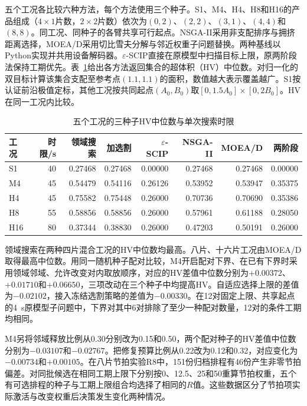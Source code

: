 五个工况各比较六种方法，每个方法使用三个种子。S1、M4、H4、H8和H16的产品组成（$4\times1$片数，$2\times2$片数）依次为$(0,2)$、$(2,2)$、$(3,1)$、$(4,4)$和$(8,8)$。同工况、同种子的各臂共享可行起点。NSGA-II采用非支配排序与拥挤距离选择\citep{deb2002}，MOEA/D采用切比雪夫分解与邻近权重子问题替换\citep{zhangli2007}。两种基线以Python实现并共用设备解码器。$\varepsilon$-SCIP直接在原模型中扫描目标上限，原两阶段法保持工期优先。表~\ref{tab:pareto-small}给出各方法返回集合的超体积（HV）中位数。对归一化的双目标计算该集合支配至参考点$(1.1,1.1)$的面积，数值越大表示覆盖越广。S1按认证前沿极值定标，其他工况按共同起点$(A_0,B_0)$取$[0,1.5A_0]\times[0,2B_0]$。HV在同一工况内比较。
\begin{table}[!htbp]\centering\small
\caption{五个工况的三种子HV中位数与单次搜索时限}\label{tab:pareto-small}
\begin{tabular}{lrrrrrrr}\toprule
工况 & 时限/s & 领域搜索 & 加选割 & $\varepsilon$-SCIP & NSGA-II & MOEA/D & 两阶段 \\\midrule
S1 & 40 & 0.27468 & 0.27468 & 0.00000 & 0.27468 & 0.27468 & 0.00000 \\
M4 & 45 & 0.54479 & 0.54116 & 0.26126 & 0.53952 & 0.53947 & 0.35375 \\
H4 & 45 & 0.75582 & 0.75448 & 0.26000 & 0.70736 & 0.70690 & 0.35386 \\
H8 & 55 & 0.58856 & 0.58856 & 0.26000 & 0.57961 & 0.61188 & 0.28050 \\
H16 & 80 & 0.37344 & 0.38830 & 0.26000 & 0.47203 & 0.50191 & 0.26000 \\
\bottomrule\end{tabular}
\end{table}

领域搜索在两种四片混合工况的HV中位数均最高。八片、十六片工况由MOEA/D取得最高中位数。用同一随机种子配对比较，M4开启配对下界、在已有下界时采用领域邻域、允许改变对内取放顺序，对应的HV差值中位数分别为$+0.00372$、$+0.01710$和$+0.06650$，三项改动在三个种子中均提高HV。自适应选择上限的差值为$-0.02102$，接入冻结选割策略的差值为$-0.00330$。在12对固定上限、共享起点的4~s原模型子问题中，下界对其中6对排除了至少一种配对数量，12对的条件工期均相同。

M4另将邻域释放比例从0.30分别改为0.15和0.50，两个配对种子的HV差值中位数分别为$-0.03107$和$-0.02767$。把修复预算比例从0.22改为0.12和0.32，对应变化为$-0.00734$和$+0.00105$。在八片节拍实验R8中，151份归档排程有46份产生非零节拍偏差。对同批候选在相同工期上限下分别按0、12.5、25和50重算节拍权重，五个有可选排程的种子与工期上限组合均选择了相同的$R$值。这些数据区分了节拍项实际激活与改变权重后决策发生变化两种情况。

